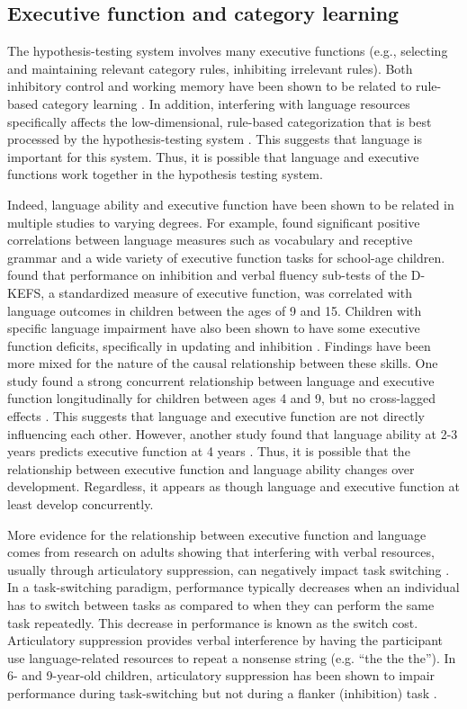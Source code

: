 \documentclass[../dissertation.tex]{subfiles}
\begin{document}
\subsection{Executive function and category learning}
The hypothesis-testing system involves many executive functions (e.g., selecting and maintaining relevant category rules, inhibiting irrelevant rules). Both inhibitory control and working memory have been shown to be related to rule-based category learning \citep{Rabi2014}. In addition, interfering with language resources specifically affects the low-dimensional, rule-based categorization that is best processed by the hypothesis-testing system \citep{Lupyan2009,Minda2008}. This suggests that language is important for this system. Thus, it is possible that language and executive functions work together in the hypothesis testing system. \par
	Indeed, language ability and executive function have been shown to be related in multiple studies to varying degrees. For example, \citet{Figueras2008} found significant positive correlations between language measures such as vocabulary and receptive grammar and a wide variety of executive function tasks for school-age children. \citet{Berninger2017} found that performance on inhibition and verbal fluency sub-tests of the D-KEFS, a standardized measure of executive function, was correlated with language outcomes in children between the ages of 9 and 15. Children with specific language impairment have also been shown to have some executive function deficits, specifically in updating and inhibition \citep{Im-Bolter2006}. Findings have been more mixed for the nature of the causal relationship between these skills. One study found a strong concurrent relationship between language and executive function longitudinally for children between ages 4 and 9, but no cross-lagged effects \citep{Gooch2016}. This suggests that language and executive function are not directly influencing each other. However, another study found that language ability at 2-3 years predicts executive function at 4 years \citep{Kuhn2014}. Thus, it is possible that the relationship between executive function and language ability changes over development. Regardless, it appears as though language and executive function at least develop concurrently. \par
	More evidence for the relationship between executive function and language comes from research on adults showing that interfering with verbal resources, usually through articulatory suppression, can negatively impact task switching \citep{Baddeley2001,Emerson2003}. In a task-switching paradigm, performance typically decreases when an individual has to switch between tasks as compared to when they can perform the same task repeatedly. This decrease in performance is known as the switch cost. Articulatory suppression provides verbal interference by having the participant use language-related resources to repeat a nonsense string (e.g. “the the the”). In 6- and 9-year-old children, articulatory suppression has been shown to impair performance during task-switching but not during a flanker (inhibition) task \citep{Fatzer2012}. \par
\end{document}

